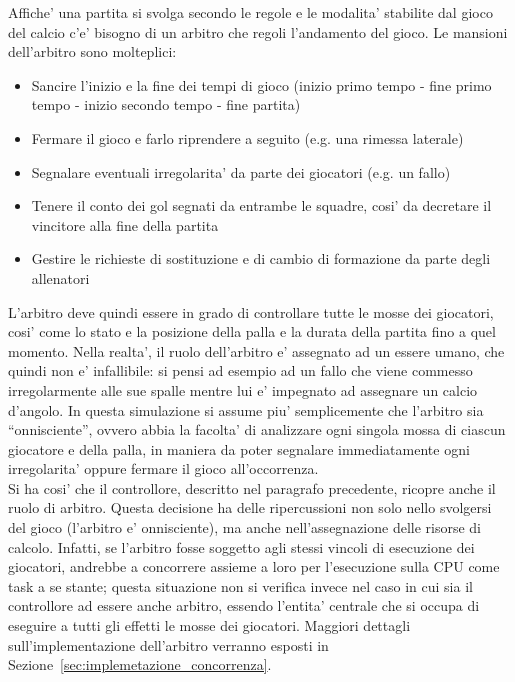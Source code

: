 Affiche' una partita si svolga secondo le regole e le modalita' stabilite dal gioco del calcio c'e' bisogno di un arbitro che regoli l'andamento del gioco. Le mansioni dell'arbitro sono molteplici:

\begin{itemize}
	\item Sancire l'inizio e la fine dei tempi di gioco (inizio primo tempo - fine primo tempo - inizio secondo tempo - fine partita)
	\item Fermare il gioco e farlo riprendere a seguito (e.g. una rimessa laterale)
	\item Segnalare eventuali irregolarita' da parte dei giocatori (e.g. un fallo)
	\item Tenere il conto dei gol segnati da entrambe le squadre, cosi' da decretare il vincitore alla fine della partita
	\item Gestire le richieste di sostituzione e di cambio di formazione da parte degli allenatori
\end{itemize}

L'arbitro deve quindi essere in grado di controllare tutte le mosse dei giocatori, cosi' come lo stato e la posizione della palla e la durata della partita fino a quel momento. Nella realta', il ruolo dell'arbitro e' assegnato ad un essere umano, che quindi non e' infallibile: si pensi ad esempio ad un fallo che viene commesso irregolarmente alle sue spalle mentre lui e' impegnato ad assegnare un calcio d'angolo. In questa simulazione si assume piu' semplicemente che l'arbitro sia ``onnisciente'', ovvero abbia la facolta' di analizzare ogni singola mossa di ciascun giocatore e della palla, in maniera da poter segnalare immediatamente ogni irregolarita' oppure fermare il gioco all'occorrenza.\\

Si ha cosi' che il controllore, descritto nel paragrafo precedente, ricopre anche il ruolo di arbitro. Questa decisione ha delle ripercussioni non solo nello svolgersi del gioco (l'arbitro e' onnisciente), ma anche nell'assegnazione delle risorse di calcolo. Infatti, se l'arbitro fosse soggetto agli stessi vincoli di esecuzione dei giocatori, andrebbe a concorrere assieme a loro per l'esecuzione sulla CPU come task a se stante; questa situazione non si verifica invece nel caso in cui sia il controllore ad essere anche arbitro, essendo l'entita' centrale che si occupa di eseguire a tutti gli effetti le mosse dei giocatori. Maggiori dettagli sull'implementazione dell'arbitro verranno esposti in Sezione~\ref{sec:implemetazione_concorrenza}.\\


